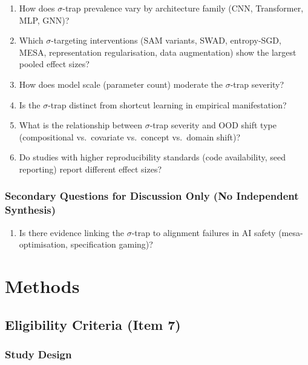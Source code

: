 \begin{enumerate}[label=S\arabic*:, nosep]
\item How does $\sigma$-trap prevalence vary by architecture family (CNN, Transformer, MLP, GNN)?
\item Which $\sigma$-targeting interventions (SAM variants, SWAD, entropy-SGD, MESA, representation regularisation, data augmentation) show the largest pooled effect sizes?
\item How does model scale (parameter count) moderate the $\sigma$-trap severity?
\item Is the $\sigma$-trap distinct from shortcut learning in empirical manifestation?
\item What is the relationship between $\sigma$-trap severity and OOD shift type (compositional vs.\ covariate vs.\ concept vs.\ domain shift)?
\item Do studies with higher reproducibility standards (code availability, seed reporting) report different effect sizes?
\end{enumerate}

\subsubsection{Secondary Questions for Discussion Only (No Independent Synthesis)}

\begin{enumerate}[label=D\arabic*:, nosep, start=7]
\item Is there evidence linking the $\sigma$-trap to alignment failures in AI safety (mesa-optimisation, specification gaming)?
\end{enumerate}

\section{Methods}\label{sec:methods}

\subsection{Eligibility Criteria (Item 7)}

\subsubsection{Study Design}

